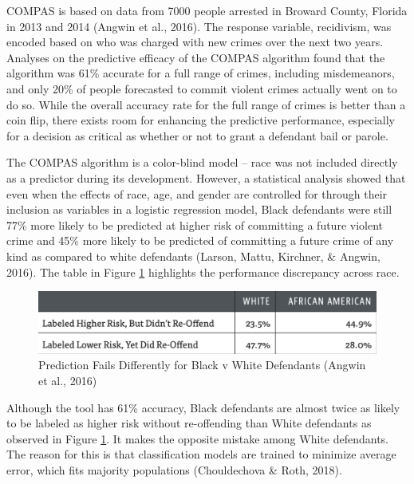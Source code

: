 \documentclass[12pt, twoside]{amherstthesis}
\begin{document}
COMPAS is based on data from 7000 people arrested in Broward County, Florida in 2013 and 2014 (Angwin et al., 2016). The response variable, recidivism, was encoded based on who was charged with new crimes over the next two years. Analyses on the predictive efficacy of the COMPAS algorithm found that the algorithm was 61\% accurate for a full range of crimes, including misdemeanors, and only 20\% of people forecasted to commit violent crimes actually went on to do so. While the overall accuracy rate for the full range of crimes is better than a coin flip, there exists room for enhancing the predictive performance, especially for a decision as critical as whether or not to grant a defendant bail or parole.

The COMPAS algorithm is a color-blind model -- race was not included directly as a predictor during its development. However, a statistical analysis showed that even when the effects of race, age, and gender are controlled for through their inclusion as variables in a logistic regression model, Black defendants were still 77\% more likely to be predicted at higher risk of committing a future violent crime and 45\% more likely to be predicted of committing a future crime of any kind as compared to white defendants (Larson, Mattu, Kirchner, \& Angwin, 2016). The table in Figure \ref{fig:compas1} highlights the performance discrepancy across race.
\begin{figure}

{\centering \includegraphics[width=1\linewidth]{figures/compas1} 

}

\caption[COMPAS Prediction Fails Differently for Black v White Defendants]{Prediction Fails Differently for Black v White Defendants (Angwin et al., 2016)}\label{fig:compas1}
\end{figure}
Although the tool has 61\% accuracy, Black defendants are almost twice as likely to be labeled as higher risk without re-offending than White defendants as observed in Figure \ref{fig:compas1}. It makes the opposite mistake among White defendants. The reason for this is that classification models are trained to minimize average error, which fits majority populations (Chouldechova \& Roth, 2018).
\end{document}
